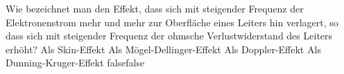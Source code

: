     {Wie bezeichnet man den Effekt, dass sich mit steigender Frequenz der Elektronenstrom mehr und mehr zur Oberfläche eines Leiters hin verlagert, so dass sich mit steigender Frequenz der ohmsche Verlustwiderstand des Leiters erhöht?}
    {Als Skin-Effekt}
    {Als Mögel-Dellinger-Effekt}
    {Als Doppler-Effekt}
    {Als Dunning-Kruger-Effekt}
    {false}{false}